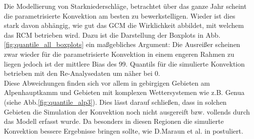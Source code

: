 Die Modellierung von Starkniederschläge, betrachtet über das ganze Jahr scheint die parametrisierte Konvektion am besten zu bewerkstelligen. Wieder ist dies stark davon abhängig, wie gut das GCM die Wirklichkeit abbildet, mit welchem das RCM betrieben wird. Dazu ist die Darstellung der Boxplots in Abb.\ref{fig:quantile_all_boxplots} ein maßgebliches Argument: Die Ausreißer scheinen zwar wieder für die parametrisierte Konvektion in einem engeren Rahmen zu liegen jedoch ist der mittlere Bias des 99. Quantils für die simulierte Konvektion betrieben mit den Re-Analysedaten um näher bei 0.\\
Diese Abweichungen finden sich vor allem in gebirgigen Gebieten am Alpenhauptkamm und  Gebieten mit komplexen Wettersystemen wie z.B. Genua (siehe Abb.\ref{fig:quantile_alp3}). Dies lässt darauf schließen, dass in solchen Gebieten die Simulation der Konvektion noch nicht ausgereift bzw. vollends durch das Modell erfasst wurde. Da besonders in diesen Regionen die simulierte Konvektion bessere Ergebnisse bringen sollte, wie D.Maraun et al. in \cite{maraun_value} postuliert.\vspace{7pt}\\

